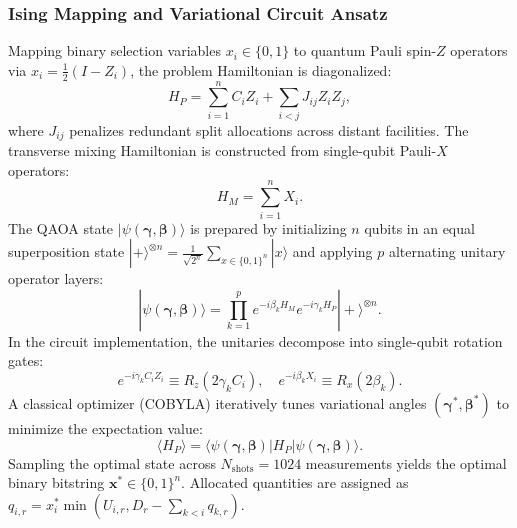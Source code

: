 \documentclass[conference]{IEEEtran}
\begin{document}
\subsubsection{Ising Mapping and Variational Circuit Ansatz}
Mapping binary selection variables $x_i \in \{0, 1\}$ to quantum Pauli spin-$Z$ operators via $x_i = \frac{1}{2}(I - Z_i)$, the problem Hamiltonian is diagonalized:
\begin{equation}
H_P = \sum_{i=1}^n C_i Z_i + \sum_{i < j} J_{ij} Z_i Z_j,
\label{eq:ising_hp}
\end{equation}
where $J_{ij}$ penalizes redundant split allocations across distant facilities. The transverse mixing Hamiltonian is constructed from single-qubit Pauli-$X$ operators:
\begin{equation}
H_M = \sum_{i=1}^n X_i.
\label{eq:mixer_hm}
\end{equation}
The QAOA state $|\psi(\boldsymbol{\gamma}, \boldsymbol{\beta})\rangle$ is prepared by initializing $n$ qubits in an equal superposition state $|+\rangle^{\otimes n} = \frac{1}{\sqrt{2^n}}\sum_{x \in \{0,1\}^n} |x\rangle$ and applying $p$ alternating unitary operator layers:
\begin{equation}
|\psi(\boldsymbol{\gamma}, \boldsymbol{\beta})\rangle = \prod_{k=1}^p e^{-i \beta_k H_M} e^{-i \gamma_k H_P} |+\rangle^{\otimes n}.
\label{eq:qaoa_state}
\end{equation}
In the circuit implementation, the unitaries decompose into single-qubit rotation gates:
\begin{equation}
e^{-i \gamma_k C_i Z_i} \equiv R_z(2 \gamma_k C_i), \quad e^{-i \beta_k X_i} \equiv R_x(2 \beta_k).
\label{eq:rotations}
\end{equation}
A classical optimizer (COBYLA) iteratively tunes variational angles $(\boldsymbol{\gamma}^*, \boldsymbol{\beta}^*)$ to minimize the expectation value:
\begin{equation}
\langle H_P \rangle = \langle \psi(\boldsymbol{\gamma}, \boldsymbol{\beta}) | H_P | \psi(\boldsymbol{\gamma}, \boldsymbol{\beta}) \rangle.
\label{eq:qaoa_exp}
\end{equation}
Sampling the optimal state across $N_{\text{shots}} = 1024$ measurements yields the optimal binary bitstring $\mathbf{x}^* \in \{0, 1\}^n$. Allocated quantities are assigned as $q_{i,r} = x^*_i \min(U_{i,r}, D_r - \sum_{k < i} q_{k,r})$.
\end{document}
